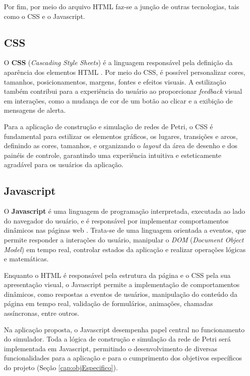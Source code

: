 \documentclass[
	12pt,				%
	openright,			%
	oneside,			%
	a4paper,			%
	english,			%
	brazil				%
	]{abntex2}
\theoremstyle{doispontos}
\begin{document}
Por fim, por meio do arquivo HTML faz-se a junção de outras tecnologias, tais como o CSS e o Javascript. 

\subsection{CSS}

O \textbf{CSS} (\textit{Cascading Style Sheets}) é a linguagem responsável pela definição da aparência dos elementos HTML \textcite{mdn_css}. Por meio do CSS, é possível personalizar cores, tamanhos, posicionamentos, margens, fontes e efeitos visuais. A estilização também contribui para a experiência do usuário ao proporcionar \textit{feedback} visual em interações, como a mudança de cor de um botão ao clicar e a exibição de mensagens de alerta. 

Para a aplicação de construção e simulação de redes de Petri, o CSS é fundamental para estilizar os elementos gráficos, os lugares, transições e arcos, definindo as cores, tamanhos, e organizando o \textit{layout} da área de desenho e dos painéis de controle, garantindo uma experiência intuitiva e esteticamente agradável para os usuários da aplicação. 

\subsection{Javascript}

O \textbf{Javascript} é uma linguagem de programação interpretada, executada ao lado do navegador do usuário, e é responsável por implementar comportamentos dinâmicos nas páginas web \textcite{mdn_css}. Trata-se de uma linguagem orientada a eventos, que permite responder a interações do usuário, manipular o \textit{DOM} (\textit{Document Object Model}) em tempo real, controlar estados da aplicação e realizar operações lógicas e matemáticas.

Enquanto o HTML é responsável pela estrutura da página e o CSS pela sua apresentação visual, o Javascript permite a implementação de comportamentos dinâmicos, como respostas a eventos de usuários, manipulação do conteúdo da página em tempo real, validação de formulários, animações, chamadas assíncronas, entre outros. 

Na aplicação proposta, o Javascript desempenha papel central no funcionamento do simulador. Toda a lógica de construção e simulação da rede de Petri será implementada em Javascript, permitindo o desenvolvimento de diversas funcionalidades para a aplicação e para o cumprimento dos objetivos específicos do projeto (Seção \ref{cap:objEspecifico}). 
\end{document}
